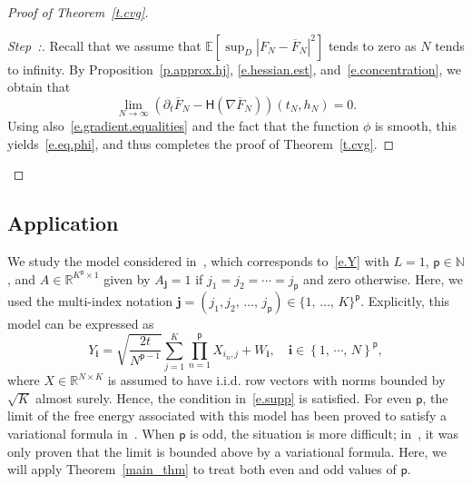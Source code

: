 \documentclass[AHL,Unicode,longabstracts,published]{cedram}
\newcommand{\N}{\mathbb{N}}
\newcommand{\R}{\mathbb{R}}
\newcommand{\E}{\mathbb{E}}
\newcommand{\bfj}{\mathbf{j}}
\newcommand{\bfi}{\mathbf{i}}
\renewcommand{\H}{\mathsf{H}}
\newcommand{\sfp}{\mathsf{p}}
\renewcommand{\bar}{\overline}
\newcommand{\Ll}{\left}
\newcommand{\Rr}{\right}
\newcounter{stepcount}
\newenvironment{step}{\refstepcounter{stepcount}\begin{proof}[Step~\thestepcount:]}{\let\qed\relax\end{proof}}
\begin{document}
\begin{proof}[Proof of Theorem~\ref{t.cvg}]
\begin{step}\label{proof-the5.1-step3}
Recall that we assume that $\E \Ll[\sup_D |F_N - \bar F_N|^2 \Rr] $ tends to zero as $N$ tends to infinity. By Proposition~\ref{p.approx.hj}, \eqref{e.hessian.est}, and~\eqref{e.concentration}, we obtain that
\begin{equation*}
\lim_{N \to \infty} \Ll(\partial_t\bar F_N-\H(\nabla\bar F_N)\Rr)(t_N,h_N) = 0.
\end{equation*}
Using also~\eqref{e.gradient.equalities} and the fact that the function $\phi$ is smooth, this yields~\eqref{e.eq.phi}, and thus completes the proof of Theorem~\ref{t.cvg}.\qedhere
\end{step}\let\qed\relax
\end{proof}

\subsection{Application}\label{s.app}
We study the model considered in~\cite{luneau2019mutual}, which corresponds to~\eqref{e.Y} with $L=1$, $\sfp\in\N$, and $A\in\R^{K^\sfp\times 1}$ given by $A_{\bfj}=1$ if $j_1=j_2=\cdots = j_\sfp$ and zero otherwise. Here, we used the multi-index notation $\bfj=(j_1,j_2,\,\dots,\,j_\sfp)\in \{1,\,\dots,\,K\}^\sfp$. Explicitly, this model can be expressed as
\begin{equation}\label{e.special}
Y_{\bfi} = \sqrt{\frac{2t}{N^{\sfp-1}}} \sum_{j=1}^K\prod_{n=1}^\sfp X_{i_n, j}+W_{\bfi},\quad \bfi \in \left\{1,\,\cdots,\,N\right\}^\sfp,
\end{equation}
where $X\in \R^{N\times K}$ is assumed to have i.i.d. row vectors {with norms bounded by $\sqrt{K}$ almost surely. Hence, the condition in~\eqref{e.supp} is satisfied.} For even $\sfp$, the limit of the free energy associated with this model has been proved to satisfy a variational formula in~\cite{luneau2019mutual}. When $\sfp$ is odd, the situation is more difficult; in~\cite{HBJ}, it was only proven that the limit is bounded above by a variational formula. Here, we will apply Theorem~\ref{main_thm} to treat both even and odd values of $\sfp$.
\end{document}
